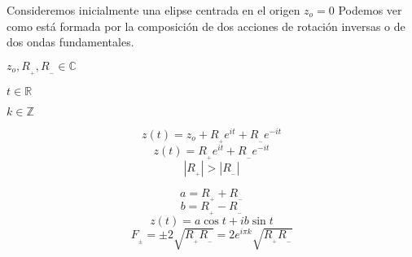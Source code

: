 \documentclass[preview]{standalone}
\begin{document}
\begin{center}
Consideremos inicialmente una elipse centrada en el origen $z_o=0$ 
Podemos ver como  está formada por la composición  de dos acciones 
de rotación inversas o de dos ondas fundamentales.

$z_o , R_{_+} , R_{_-} \in \mathbb{C}$  

$t \in \mathbb{R}$    

$k \in \mathbb{Z}$


$$z(t)=z_o+ R_{_+} e^{it} +R_{_-} e^{-it}$$ 
$$z(t)=R_{_+} e^{it} +R_{_-} e^{-it}$$
$$|R_{_+}|>|R_{_-}|$$  

$$a=R_{_+}+R_{_-}$$ 
$$b=R_{_+}-R_{_-}$$
$$z(t)=a\cos{t}+i b \sin{t}$$ 
$$F_{_{\pm}}=\pm 2\sqrt{R_{_+}R_{_-}}=2 e^{i\pi k} \sqrt{R_{_+}R_{_-}}$$
\end{center}
\end{document}
